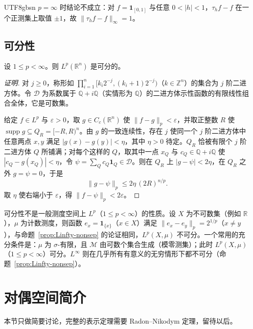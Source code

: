 \documentclass[11pt]{article}
\newcommand{\R}{\mathbb{R}}
\newcommand{\Q}{\mathbb{Q}}
\newcommand{\M}{\mathcal{M}}
\newcommand{\norm}[1]{\lVert #1\rVert}
\newcommand{\ind}{\mathbf{1}}
\DeclareMathOperator{\supp}{supp}
\begin{document}
\begin{CJK*}{UTF8}{gbsn}
$p=\infty$ 时结论不成立：对 $f=\ind_{[0,1]}$ 与任意 $0<|h|<1$，$\tau_{h}f-f$ 在一个正测集上取值 $\pm1$，故 $\norm{\tau_{h}f-f}_{\infty}=1$。

\subsection{可分性}

\begin{theorem}\label{thm:separable}
设 $1\le p<\infty$。则 $L^{p}(\R^{n})$ 是可分的。
\end{theorem}

\begin{proof}[证明]
对 $j\ge0$，称形如 $\prod_{i=1}^{n}[k_{i}2^{-j},(k_{i}+1)2^{-j})$（$k\in\mathbb{Z}^{n}$）的集合为 $j$ 阶二进方体。令 $\mathcal{D}$ 为系数属于 $\Q+i\Q$（实情形为 $\Q$）的二进方体示性函数的有限线性组合全体，它是可数集。

给定 $f\in L^{p}$ 与 $\varepsilon>0$，取 $g\in C_{c}(\R^{n})$ 使 $\norm{f-g}_{p}<\varepsilon$，并取正整数 $R$ 使 $\supp g\subseteq Q_{R}=[-R,R)^{n}$。由 $g$ 的一致连续性，存在 $j$ 使同一个 $j$ 阶二进方体中任意两点 $x,y$ 满足 $|g(x)-g(y)|<\eta$，其中 $\eta>0$ 待定。$Q_{R}$ 恰被有限个 $j$ 阶二进方体 $Q$ 所铺满；对每个这样的 $Q$，取其中一点 $x_{Q}$ 与 $c_{Q}\in\Q+i\Q$ 使 $|c_{Q}-g(x_{Q})|<\eta$，令 $\psi=\sum_{Q}c_{Q}\ind_{Q}\in\mathcal{D}$。则在 $Q_{R}$ 上 $|g-\psi|<2\eta$，在 $Q_{R}$ 之外 $g=\psi=0$，于是
\[
\norm{g-\psi}_{p}\le2\eta\,(2R)^{n/p}.
\]
取 $\eta$ 使右端小于 $\varepsilon$，得 $\norm{f-\psi}_{p}<2\varepsilon$。
\end{proof}

\begin{remark}
可分性不是一般测度空间上 $L^{p}$（$1\le p<\infty$）的性质。设 $X$ 为不可数集（例如 $\R$），$\mu$ 为计数测度，则函数 $e_{x}=\ind_{\{x\}}$（$x\in X$）满足 $\norm{e_{x}-e_{y}}_{p}=2^{1/p}$（$x\ne y$），与命题~\ref{prop:Linfty-nonsep} 的论证相同，$L^{p}(X,\mu)$ 不可分。一个常用的充分条件是：$\mu$ 为 $\sigma$-有限，且 $\M$ 由可数个集合生成（模零测集）；此时 $L^{p}(X,\mu)$（$1\le p<\infty$）可分。$L^{\infty}$ 则在几乎所有有意义的无穷情形下都不可分（命题~\ref{prop:Linfty-nonsep}）。
\end{remark}

\section{对偶空间简介}

本节只做简要讨论，完整的表示定理需要 Radon--Nikodym 定理，留待以后。


\end{CJK*}
\end{document}
